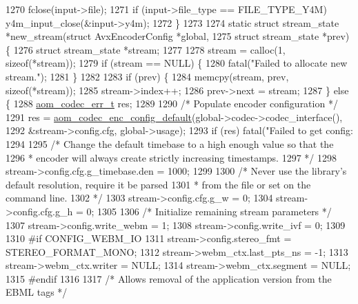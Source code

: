 \begin{DoxyCodeInclude}
{{{{{{{{{{{{{{{1270   fclose(input->file);
1271   \textcolor{keywordflow}{if} (input->file\_type == FILE\_TYPE\_Y4M) y4m\_input\_close(&input->y4m);
1272 \}
1273 
1274 \textcolor{keyword}{static} \textcolor{keyword}{struct }stream\_state *new\_stream(\textcolor{keyword}{struct} AvxEncoderConfig *global,
1275                                        \textcolor{keyword}{struct} stream\_state *prev) \{
1276   \textcolor{keyword}{struct }stream\_state *stream;
1277 
1278   stream = calloc(1, \textcolor{keyword}{sizeof}(*stream));
1279   \textcolor{keywordflow}{if} (stream == NULL) \{
1280     fatal(\textcolor{stringliteral}{"Failed to allocate new stream."});
1281   \}
1282 
1283   \textcolor{keywordflow}{if} (prev) \{
1284     memcpy(stream, prev, \textcolor{keyword}{sizeof}(*stream));
1285     stream->index++;
1286     prev->next = stream;
1287   \} \textcolor{keywordflow}{else} \{
1288     \hyperlink{group__codec_gaaae61e0f8663e6137f1e228757248e7c}{aom\_codec\_err\_t} res;
1289 
1290     \textcolor{comment}{/* Populate encoder configuration */}
1291     res = \hyperlink{group__encoder_gabe456ab6f99bdebc47018779b75d2521}{aom\_codec\_enc\_config\_default}(global->codec->codec\_interface(),
1292                                        &stream->config.cfg, global->usage);
1293     \textcolor{keywordflow}{if} (res) fatal(\textcolor{stringliteral}{"Failed to get config: %
1294 
1295     \textcolor{comment}{/* Change the default timebase to a high enough value so that the}
1296 \textcolor{comment}{     * encoder will always create strictly increasing timestamps.}
1297 \textcolor{comment}{     */}
1298     stream->config.cfg.g\_timebase.den = 1000;
1299 
1300     \textcolor{comment}{/* Never use the library's default resolution, require it be parsed}
1301 \textcolor{comment}{     * from the file or set on the command line.}
1302 \textcolor{comment}{     */}
1303     stream->config.cfg.g\_w = 0;
1304     stream->config.cfg.g\_h = 0;
1305 
1306     \textcolor{comment}{/* Initialize remaining stream parameters */}
1307     stream->config.write\_webm = 1;
1308     stream->config.write\_ivf = 0;
1309 
1310 \textcolor{preprocessor}{#if CONFIG\_WEBM\_IO}
1311     stream->config.stereo\_fmt = STEREO\_FORMAT\_MONO;
1312     stream->webm\_ctx.last\_pts\_ns = -1;
1313     stream->webm\_ctx.writer = NULL;
1314     stream->webm\_ctx.segment = NULL;
1315 \textcolor{preprocessor}{#endif}
1316 
1317     \textcolor{comment}{/* Allows removal of the application version from the EBML tags */}
}}}}}}}}}}}}}}}}
\end{DoxyCodeInclude}
